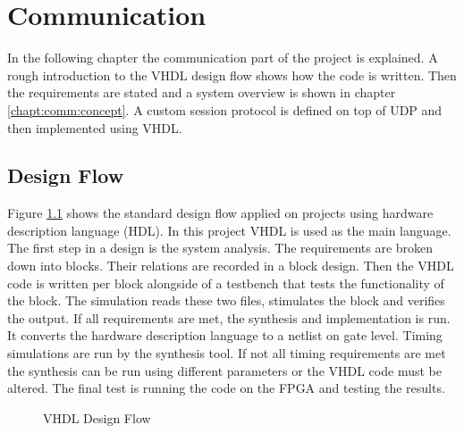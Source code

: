 %
%
\chapter{Communication} \label{chapt:comm}
In the following chapter the communication part of the project is
explained. A rough introduction to the VHDL design flow shows how the code is
written. Then the requirements are stated and a system overview is shown in
chapter \ref{chapt:comm:concept}. A custom session protocol is defined on top of
UDP and then implemented using VHDL.

%
%
\section{Design Flow}
Figure \ref{fig:vhdldesignflow} shows the standard design flow applied on
projects using hardware description language (HDL). In this project VHDL is
used as the main language. The first step in a design is the system analysis.
The requirements are broken down into blocks. Their relations are recorded in
a block design. Then the VHDL code is written per block alongside of a testbench
that tests the functionality of the block. The simulation reads these two files,
stimulates the block and verifies the output. If all requirements are met, the
synthesis and implementation is run. It converts the hardware description
language to a netlist on gate level. Timing simulations are run by the synthesis
tool. If not all timing requirements are met the synthesis can be run using
different parameters or the VHDL code must be altered. The final test is running
the code on the FPGA and testing the results.

\begin{figure}[tb!]
    \centering
    
    \caption{VHDL Design Flow}
    \label{fig:vhdldesignflow}
\end{figure}

%
%
